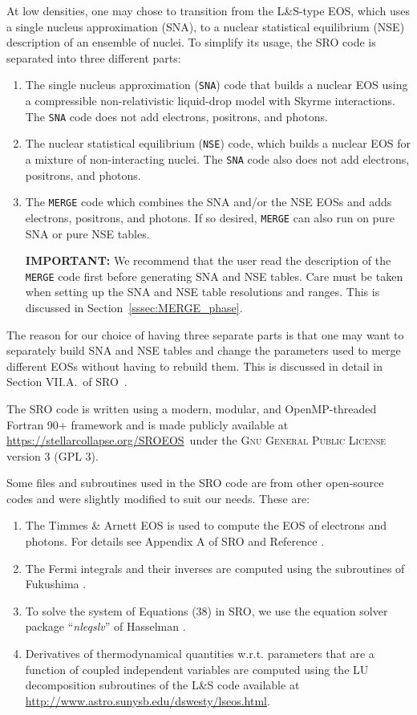 \documentclass[letterpaper,11pt]{refart}
\newcommand{\srourl}{\url{https://stellarcollapse.org/SROEOS}}
\newcommand{\LS}{L\&S }
\newcommand{\LSn}{L\&S}
\begin{document}
At low densities, one may chose to transition from the \LSn-type EOS,
which uses a single nucleus approximation (SNA), to a nuclear
statistical equilibrium (NSE) description of an ensemble of nuclei. To
simplify its usage, the SRO code is separated into three different
parts:
\begin{enumerate}[label={(\arabic*)}]
 \item The single nucleus approximation (\texttt{SNA}) code that builds a
   nuclear EOS using a compressible non-relativistic liquid-drop model
   with Skyrme interactions. The \texttt{SNA} code does not add electrons,
   positrons, and photons.
 \item The nuclear statistical equilibrium (\texttt{NSE}) code, which
   builds a nuclear EOS for a mixture of non-interacting nuclei.  The
   \texttt{SNA} code also does not add electrons, positrons, and photons.

 \item The \texttt{MERGE} code which combines the SNA and/or the NSE
   EOSs and adds electrons, positrons, and photons. If so desired,
   \texttt{MERGE} can also run on pure SNA or pure NSE tables.

   \textbf{IMPORTANT:} We recommend that the user read the description
   of the \texttt{MERGE} code first before generating SNA and NSE
   tables.  Care must be taken when setting up the SNA and NSE table
   resolutions and ranges. This is discussed in
   Section~\ref{sssec:MERGE_phase}.
   
\end{enumerate}
The reason for our choice of having three separate parts is that one
may want to separately build SNA and NSE tables and change the
parameters used to merge different EOSs without having to rebuild
them.  This is discussed in detail in Section VII.A.\ of
SRO~\cite{schneider:17}.


The SRO code is written using a modern, modular, and OpenMP-threaded Fortran
90+ framework and is made publicly available at \srourl\, under the
\textsc{Gnu General Public License} version 3 (GPL 3).

Some files and subroutines used in the SRO code are from other
open-source codes and were slightly modified to suit our needs. These
are:
\begin{enumerate}
 \item The Timmes \& Arnett EOS is used to compute the EOS of electrons and photons. For details see Appendix A of SRO and Reference \cite{timmes:99}. 
 \item The Fermi integrals and their inverses are computed using the subroutines of Fukushima \cite{fukushima:15,fukushima:15b}.
 \item To solve the system of Equations (38) in SRO, we use the equation solver package ``\textit{nleqslv}'' of Hasselman \cite{hasselman:16}. 
 \item Derivatives of thermodynamical quantities w.r.t. parameters that are a function of coupled independent variables are computed using the LU decomposition subroutines of the \LS code available at \url{http://www.astro.sunysb.edu/dswesty/lseos.html}. 
\end{enumerate}
\end{document}
